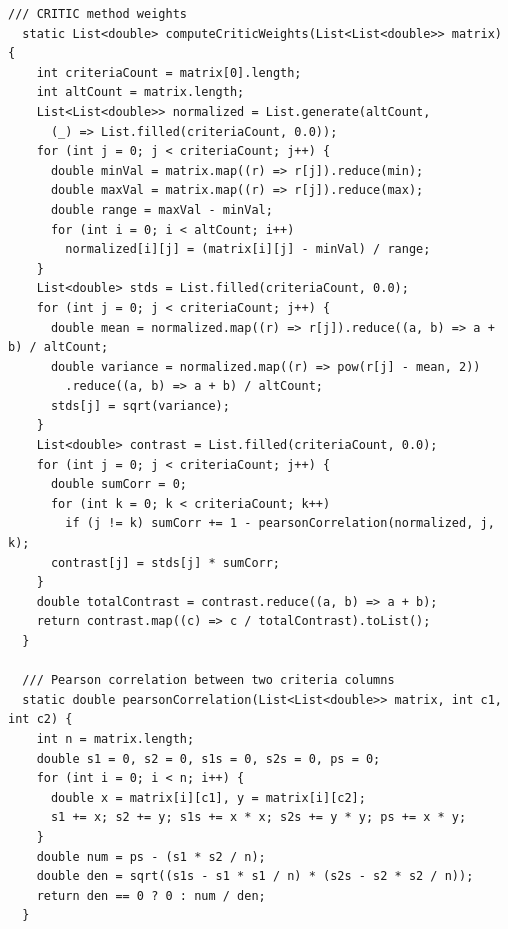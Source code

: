 \documentclass[12pt,a4paper,oneside]{report}
\begin{document}
\begin{lstlisting}[style=dartstyle]
  /// CRITIC method weights
  static List<double> computeCriticWeights(List<List<double>> matrix) {
    int criteriaCount = matrix[0].length;
    int altCount = matrix.length;
    List<List<double>> normalized = List.generate(altCount,
      (_) => List.filled(criteriaCount, 0.0));
    for (int j = 0; j < criteriaCount; j++) {
      double minVal = matrix.map((r) => r[j]).reduce(min);
      double maxVal = matrix.map((r) => r[j]).reduce(max);
      double range = maxVal - minVal;
      for (int i = 0; i < altCount; i++)
        normalized[i][j] = (matrix[i][j] - minVal) / range;
    }
    List<double> stds = List.filled(criteriaCount, 0.0);
    for (int j = 0; j < criteriaCount; j++) {
      double mean = normalized.map((r) => r[j]).reduce((a, b) => a + b) / altCount;
      double variance = normalized.map((r) => pow(r[j] - mean, 2))
        .reduce((a, b) => a + b) / altCount;
      stds[j] = sqrt(variance);
    }
    List<double> contrast = List.filled(criteriaCount, 0.0);
    for (int j = 0; j < criteriaCount; j++) {
      double sumCorr = 0;
      for (int k = 0; k < criteriaCount; k++)
        if (j != k) sumCorr += 1 - pearsonCorrelation(normalized, j, k);
      contrast[j] = stds[j] * sumCorr;
    }
    double totalContrast = contrast.reduce((a, b) => a + b);
    return contrast.map((c) => c / totalContrast).toList();
  }

  /// Pearson correlation between two criteria columns
  static double pearsonCorrelation(List<List<double>> matrix, int c1, int c2) {
    int n = matrix.length;
    double s1 = 0, s2 = 0, s1s = 0, s2s = 0, ps = 0;
    for (int i = 0; i < n; i++) {
      double x = matrix[i][c1], y = matrix[i][c2];
      s1 += x; s2 += y; s1s += x * x; s2s += y * y; ps += x * y;
    }
    double num = ps - (s1 * s2 / n);
    double den = sqrt((s1s - s1 * s1 / n) * (s2s - s2 * s2 / n));
    return den == 0 ? 0 : num / den;
  }


\end{lstlisting}
\end{document}
